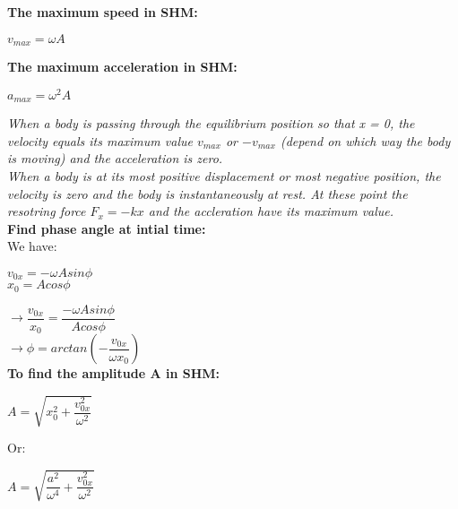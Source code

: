 \documentclass[10pt]{article}
\begin{document}
\begin{enumerate}
		\bigbreak
		\textbf{The maximum speed in SHM: } \\
		\begin{mybox}
			\begin{center}
				$v_{max} = \omega A$ 
			\end{center}
		\end{mybox}

		\bigbreak
		\textbf{The maximum acceleration in SHM: } \\
		\begin{mybox}
			\begin{center}
				$a_{max} = \omega^{2} A$
			\end{center}
		\end{mybox}

		\textit{When a body is passing through the equilibrium position so that x = 0, the velocity equals its maximum value $v_{max}$ or $-v_{max}$ (depend on which way the body is moving) and the acceleration is zero.} \\
		\textit{When a body is at its most positive displacement or most negative position, the velocity is zero and the body is instantaneously at rest. At these point the resotring force $F_{x} = -kx$ and the accleration have its maximum value.} \\

		\bigbreak
		\textbf{Find phase angle at intial time: } \\
		We have: \\
		\begin{center}
			$v_{0x} = - \omega A sin \phi$ \\
			$x_{0} = A cos \phi$
		\end{center} 

		$\rightarrow \dfrac{v_{0x}}{x_{0}} = \dfrac{- \omega A sin \phi}{A cos \phi}$ \\
		$\rightarrow \phi = arctan (- \dfrac{v_{0x}}{\omega x_{0}})$ \\

		\bigbreak
		\textbf{To find the amplitude A in SHM: } \\
		\begin{mybox}
			\begin{center}
				$A = \sqrt{x_{0}^{2} + \dfrac{v_{0x}^{2}}{\omega^{2}}}$
			\end{center}
		\end{mybox}

		\bigbreak
		Or: \\
		\begin{mybox}
			\begin{center}
				$A = \sqrt{\dfrac{a^2}{\omega^{4}} + \dfrac{v_{0x}^{2}}{\omega^{2}}}$
			\end{center}
		\end{mybox}
	\end{enumerate}
\end{document}
